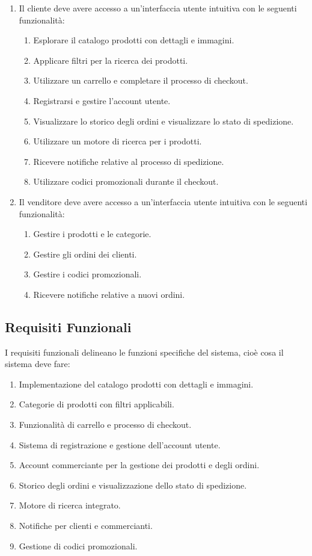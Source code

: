 \begin{enumerate}
    \item Il cliente deve avere accesso a un'interfaccia utente intuitiva con le seguenti funzionalità:
          \begin{enumerate}
              \item Esplorare il catalogo prodotti con dettagli e immagini.
              \item Applicare filtri per la ricerca dei prodotti.
              \item Utilizzare un carrello e completare il processo di checkout.
              \item Registrarsi e gestire l'account utente.
              \item Visualizzare lo storico degli ordini e visualizzare lo stato di spedizione.
              \item Utilizzare un motore di ricerca per i prodotti.
              \item Ricevere notifiche relative al processo di spedizione.
              \item Utilizzare codici promozionali durante il checkout.
          \end{enumerate}
    \item Il venditore deve avere accesso a un'interfaccia utente intuitiva con le seguenti funzionalità:
          \begin{enumerate}
              \item Gestire i prodotti e le categorie.
              \item Gestire gli ordini dei clienti.
              \item Gestire i codici promozionali.
              \item Ricevere notifiche relative a nuovi ordini.
          \end{enumerate}
\end{enumerate}

\subsection{Requisiti Funzionali}
I requisiti funzionali delineano le funzioni specifiche del sistema, cioè cosa il sistema deve fare:
\begin{enumerate}
    \item Implementazione del catalogo prodotti con dettagli e immagini.
    \item Categorie di prodotti con filtri applicabili.
    \item Funzionalità di carrello e processo di checkout.
    \item Sistema di registrazione e gestione dell'account utente.
    \item Account commerciante per la gestione dei prodotti e degli ordini.
    \item Storico degli ordini e visualizzazione dello stato di spedizione.
    \item Motore di ricerca integrato.
    \item Notifiche per clienti e commercianti.
    \item Gestione di codici promozionali.
\end{enumerate}